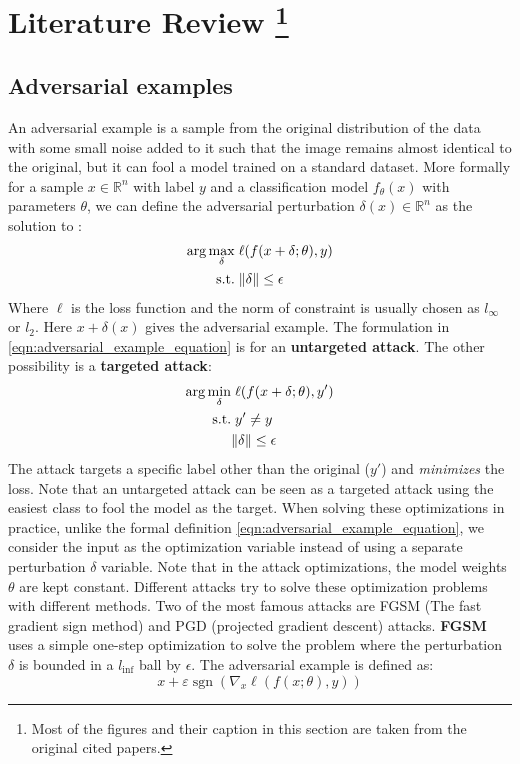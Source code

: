 \documentclass[../thesis.tex]{subfiles}
\begin{document}
\section[Literature Review]{Literature Review \protect\footnote{Most of the figures and their caption in this section are taken from the original cited papers.}} 

	\subsection{Adversarial examples}
	\label{def_adv_exp}
	An adversarial example is a sample from the original distribution of the data with some small noise added to it such that the image remains almost identical to the original, but it can fool a model trained on a standard dataset. More formally for a sample $x\in \mathbb{R}^n$ with label $y$ and a classification model $f_{\theta}(x)$ with parameters $\theta$, we can define the adversarial perturbation $ \delta(x) \in \mathbb{R}^n $ as the solution to :
	\begin{align}
	\label{eqn:adversarial_example_equation}
	\arg \max_\delta & \thickspace  \ell(f(x+\delta;\theta), y)\\
	\textrm{s.t.} & \thickspace  \Vert \delta \Vert \leq \epsilon
	\end{align}
	Where $\ell$ is the loss function and the norm of constraint is usually chosen as $l_{\infty}$ or $l_{2}$. Here $x+\delta(x)$ gives the adversarial example. The formulation in \ref{eqn:adversarial_example_equation} is for an \textbf{untargeted attack}. The other possibility is a \textbf{targeted attack}:
	\begin{align}
	\arg \min_\delta & \thickspace  \ell(f(x+\delta;\theta), y')\\
	\textrm{s.t.} & \thickspace y' \neq y \\
	&\Vert \delta \Vert \leq \epsilon
	\end{align}
	The attack targets a specific label other than the original ($y'$) and \textit{minimizes} the loss. Note that an untargeted attack can be seen as a targeted attack using the easiest class to fool the model as the target. When solving these optimizations in practice, unlike the formal definition \ref{eqn:adversarial_example_equation}, we consider the input as the optimization variable instead of using a separate perturbation $\delta$ variable. Note that in the attack optimizations, the model weights $\theta$ are kept constant. Different attacks try to solve these optimization problems with different methods. Two of the most famous attacks are FGSM (The fast gradient sign method) and PGD (projected gradient descent) attacks. \textbf{FGSM} \cite{goodfellow_fgsm} uses a simple one-step optimization to solve the problem where the perturbation $\delta$ is bounded in a $l_{\inf}$ ball by $\epsilon$. The adversarial example is defined as:
	\begin{equation}
	x+\varepsilon \operatorname{sgn}\left(\nabla_{x} \ell(f(x;\theta),y)\right)
	\end{equation}
	
\end{document}
